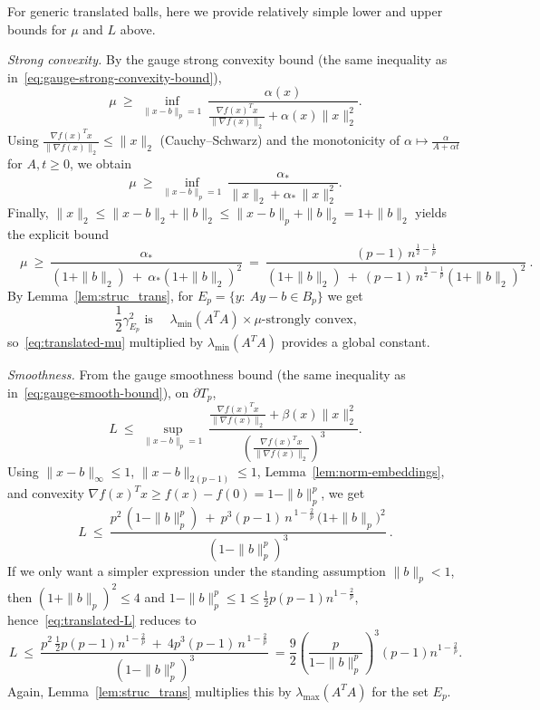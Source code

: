 \documentclass[sn-mathphys,Numbered]{sn-jnl}%
\begin{document}
\begin{appendices}
{For generic translated balls, here we provide relatively simple lower and upper bounds for $\mu$ and $L$ above. 

\noindent\emph{Strong convexity.}
By the gauge strong convexity bound (the same inequality as in~\eqref{eq:gauge-strong-convexity-bound}),
\[
\mu\ \ge\ \inf_{\|x-b\|_p=1}\ \frac{\alpha(x)}{\frac{\nabla f(x)^T x}{\|\nabla f(x)\|_2}+\alpha(x)\|x\|_2^2}.
\]
Using $\frac{\nabla f(x)^T x}{\|\nabla f(x)\|_2}\le \|x\|_2$ (Cauchy–Schwarz) and the monotonicity of
$\alpha\mapsto \frac{\alpha}{A+\alpha t}$ for $A,t\ge 0$, we obtain
\[
\mu\ \ge\ \inf_{\|x-b\|_p=1}\ \frac{\alpha_*}{\|x\|_2+\alpha_*\,\|x\|_2^2}.
\]
Finally, $\|x\|_2\le \|x-b\|_2+\|b\|_2\le \|x-b\|_p+\|b\|_2=1+\|b\|_2$ yields the explicit bound
\begin{equation}\label{eq:translated-mu}
\quad
\mu\ \ge\ \frac{\alpha_*}{(1+\|b\|_2)\ +\ \alpha_*(1+\|b\|_2)^2}
\ =\ \frac{(p-1)\,n^{\frac12-\frac1p}}{(1+\|b\|_2)\ +\ (p-1)\,n^{\frac12-\frac1p}(1+\|b\|_2)^2}\ .
\quad
\end{equation}
By Lemma~\ref{lem:struc_trans}, for $E_p=\{y:\ Ay-b\in B_p\}$ we get
\[
\text{$\frac12\gamma_{E_p}^2$ is }\quad
\lambda_{\min}(A^TA)\times \mu\text{-strongly convex,}
\]
so~\eqref{eq:translated-mu} multiplied by $\lambda_{\min}(A^TA)$ provides a global constant.

\medskip
\noindent\emph{Smoothness.}
From the gauge smoothness bound (the same inequality as in~\eqref{eq:gauge-smooth-bound}), on $\partial T_p$,
\[
L\ \le\ \sup_{\|x-b\|_p=1}\ \frac{\frac{\nabla f(x)^T x}{\|\nabla f(x)\|_2}+\beta(x)\|x\|_2^2}{\left(\frac{\nabla f(x)^T x}{\|\nabla f(x)\|_2}\right)^3}.
\]
Using $\|x-b\|_\infty\le 1$, $\|x-b\|_{2(p-1)}\le 1$, Lemma~\ref{lem:norm-embeddings}, and convexity
$\nabla f(x)^Tx\ge f(x)-f(0)=1-\|b\|_p^p$, we get
\begin{equation}\label{eq:translated-L}
\quad
L\ \le\ \frac{p^2\,(1-\|b\|_p^p)\ +\ p^3(p-1)\,n^{\,1-\frac{2}{p}}\,\big(1+\|b\|_p\big)^2}{(1-\|b\|_p^p)^3}\ .
\quad
\end{equation}
If we only want a simpler expression under the standing assumption $\|b\|_p<1$, then
$(1+\|b\|_p)^2\le 4$ and $1-\|b\|_p^p \leq 1 \leq \frac{1}{2}p(p-1)n^{1-\frac{2}{p}}$, hence~\eqref{eq:translated-L} reduces to
\[
L\ \le\ \frac{p^2\, \frac{1}{2}p(p-1)n^{1-\frac{2}{p}}\ +\ 4p^3(p-1)\,n^{\,1-\frac{2}{p}}}{(1-\|b\|_p^p)^3}\ = \frac{9}{2}\left(\frac{p}{1-\|b\|_p^p}\right)^3(p-1)n^{1-\frac{2}{p}}.
\]
Again, Lemma~\ref{lem:struc_trans} multiplies this by $\lambda_{\max}(A^TA)$ for the set $E_p$.

}
\end{appendices}
\end{document}
